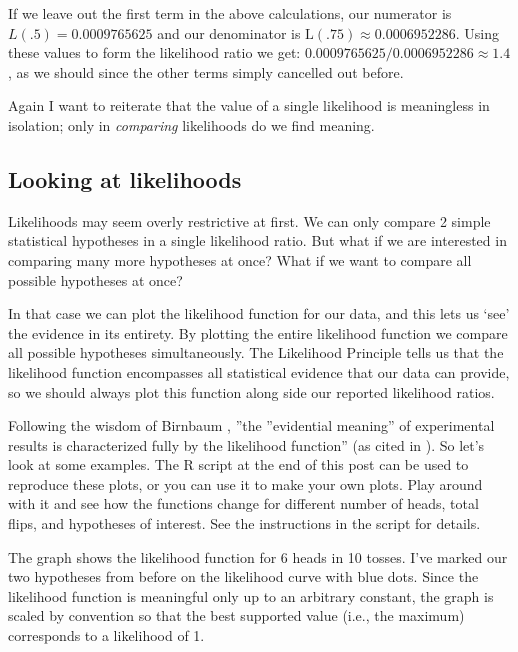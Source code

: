 If we leave out the first term in the above calculations, our numerator is $L(.5)=0.0009765625$
 and our denominator is $\mathrm{L}(.75) \approx 0.0006952286$. Using these values to form the likelihood ratio we get: $0.0009765625 / 0.0006952286 \approx 1.4$, as we should since the other terms simply cancelled out before.

Again I want to reiterate that the value of a single likelihood is meaningless in isolation; only in \textit{comparing} likelihoods do we find meaning.

\subsection{Looking at likelihoods}

Likelihoods may seem overly restrictive at first. We can only compare 2 simple statistical hypotheses in a single likelihood ratio. But what if we are interested in comparing many more hypotheses at once? What if we want to compare all possible hypotheses at once?

In that case we can plot the likelihood function for our data, and this lets us ‘see' the evidence in its entirety. By plotting the entire likelihood function we compare all possible hypotheses simultaneously. The Likelihood Principle tells us that the likelihood function encompasses all statistical evidence that our data can provide, so we should always plot this function along side our reported likelihood ratios.

Following the wisdom of Birnbaum \cite{Birnbaum1962}, ''the ''evidential meaning'' of experimental results is characterized fully by the likelihood function'' (as cited in \cite[p 25]{Royall2000}). So let's look at some examples. The R script at the end of this post can be used to reproduce these plots, or you can use it to make your own plots. Play around with it and see how the functions change for different number of heads, total flips, and hypotheses of interest. See the instructions in the script for details.

The graph shows the likelihood function for 6 heads in 10 tosses. I've marked our two hypotheses from before on the likelihood curve with blue dots. Since the likelihood function is meaningful only up to an arbitrary constant, the graph is scaled by convention so that the best supported value (i.e., the maximum) corresponds to a likelihood of 1.

